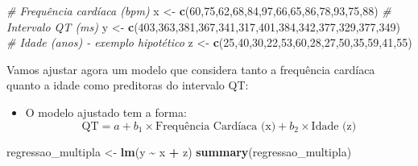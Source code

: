\documentclass[
]{book}
\newenvironment{Shaded}{\begin{snugshade}}{\end{snugshade}}
\newcommand{\CommentTok}[1]{\textcolor[rgb]{0.56,0.35,0.01}{\textit{#1}}}
\newcommand{\DecValTok}[1]{\textcolor[rgb]{0.00,0.00,0.81}{#1}}
\newcommand{\FunctionTok}[1]{\textcolor[rgb]{0.13,0.29,0.53}{\textbf{#1}}}
\newcommand{\NormalTok}[1]{#1}
\newcommand{\OtherTok}[1]{\textcolor[rgb]{0.56,0.35,0.01}{#1}}
\newcommand{\SpecialCharTok}[1]{\textcolor[rgb]{0.81,0.36,0.00}{\textbf{#1}}}
\providecommand{\tightlist}{%
  \setlength{\itemsep}{0pt}\setlength{\parskip}{0pt}}
\begin{document}
\begin{Shaded}
\begin{Highlighting}[]
\CommentTok{\# Frequência cardíaca (bpm)}
\NormalTok{x }\OtherTok{\textless{}{-}} \FunctionTok{c}\NormalTok{(}\DecValTok{60}\NormalTok{,}\DecValTok{75}\NormalTok{,}\DecValTok{62}\NormalTok{,}\DecValTok{68}\NormalTok{,}\DecValTok{84}\NormalTok{,}\DecValTok{97}\NormalTok{,}\DecValTok{66}\NormalTok{,}\DecValTok{65}\NormalTok{,}\DecValTok{86}\NormalTok{,}\DecValTok{78}\NormalTok{,}\DecValTok{93}\NormalTok{,}\DecValTok{75}\NormalTok{,}\DecValTok{88}\NormalTok{)}
\CommentTok{\# Intervalo QT (ms)}
\NormalTok{y }\OtherTok{\textless{}{-}} \FunctionTok{c}\NormalTok{(}\DecValTok{403}\NormalTok{,}\DecValTok{363}\NormalTok{,}\DecValTok{381}\NormalTok{,}\DecValTok{367}\NormalTok{,}\DecValTok{341}\NormalTok{,}\DecValTok{317}\NormalTok{,}\DecValTok{401}\NormalTok{,}\DecValTok{384}\NormalTok{,}\DecValTok{342}\NormalTok{,}\DecValTok{377}\NormalTok{,}\DecValTok{329}\NormalTok{,}\DecValTok{377}\NormalTok{,}\DecValTok{349}\NormalTok{)}
\CommentTok{\# Idade (anos) {-} exemplo hipotético}
\NormalTok{z }\OtherTok{\textless{}{-}} \FunctionTok{c}\NormalTok{(}\DecValTok{25}\NormalTok{,}\DecValTok{40}\NormalTok{,}\DecValTok{30}\NormalTok{,}\DecValTok{22}\NormalTok{,}\DecValTok{53}\NormalTok{,}\DecValTok{60}\NormalTok{,}\DecValTok{28}\NormalTok{,}\DecValTok{27}\NormalTok{,}\DecValTok{50}\NormalTok{,}\DecValTok{35}\NormalTok{,}\DecValTok{59}\NormalTok{,}\DecValTok{41}\NormalTok{,}\DecValTok{55}\NormalTok{)}
\end{Highlighting}
\end{Shaded}

Vamos ajustar agora um modelo que considera tanto a frequência cardíaca quanto a idade como preditoras do intervalo QT:

\begin{itemize}
\tightlist
\item
  O modelo ajustado tem a forma:
  \[
  \text{QT} = a + b_1 \times \text{Frequência Cardíaca (x)} + b_2 \times \text{Idade (z)}
  \]
\end{itemize}

\begin{Shaded}
\begin{Highlighting}[]
\NormalTok{regressao\_multipla }\OtherTok{\textless{}{-}} \FunctionTok{lm}\NormalTok{(y }\SpecialCharTok{\textasciitilde{}}\NormalTok{ x }\SpecialCharTok{+}\NormalTok{ z)}
\FunctionTok{summary}\NormalTok{(regressao\_multipla)}
\end{Highlighting}
\end{Shaded}
\end{document}
